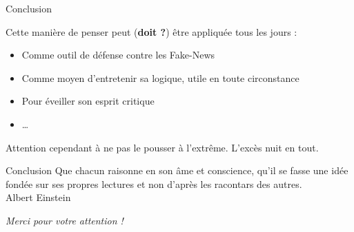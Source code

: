 \documentclass[usenames, dvipsnames]{beamer}
\begin{document}
\begin{frame}[plain]{Conclusion}

Cette manière de penser peut (\textbf{doit ?}) être appliquée tous les jours \pause : 
\begin{itemize}
\item Comme outil de défense contre les Fake-News
\item Comme moyen d'entretenir sa logique, utile en toute circonstance
\item Pour éveiller son esprit critique
\item \ldots
\end{itemize}

\pause Attention cependant à ne pas le pousser à l'extrême. L'excès nuit en tout.
\end{frame}



\begin{frame}[plain]{Conclusion}
Que chacun raisonne en son âme et conscience, qu'il se fasse une idée fondée sur ses propres lectures et non d'après les racontars des autres. \vspace{1cm} \\ Albert Einstein
\end{frame}


\begin{frame}[plain]
\vspace{2cm}
{\huge\color{umons-red}
\begin{center}
\textit{\textrm{Merci pour votre attention !}}
\end{center}}
\end{frame}
\end{document}
